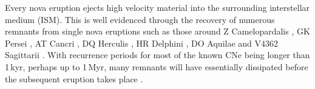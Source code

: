 \documentclass[fleqn,usenatbib]{mnras}
\begin{document}
Every nova eruption ejects high velocity material into the surrounding interstellar medium (ISM). This is well evidenced through the recovery of numerous remnants from single nova eruptions such as those around Z Camelopardalis \citep{2007Natur.446..159S}, GK Persei \citep{2004ApJ...600L..63B,2016A&A...595A..64H}, AT Cancri \citep{2012ApJ...758..121S}, DQ Herculis \citep{1978ApJ...224..171W}, HR Delphini \citep{2003MNRAS.344.1219H}, DO Aquilae and V4362 Sagittarii \citep{2020MNRAS.499.2959H}. With recurrence periods for most of the known CNe being longer than 1\,kyr, perhaps up to 1\,Myr, many remnants will have essentially dissipated before the subsequent eruption takes place \citep{2023MNRAS.521.3004H}.
\begin{figure}
\centering
{} \quad
{}\\
 \quad
{}

\end{figure}
\end{document}
